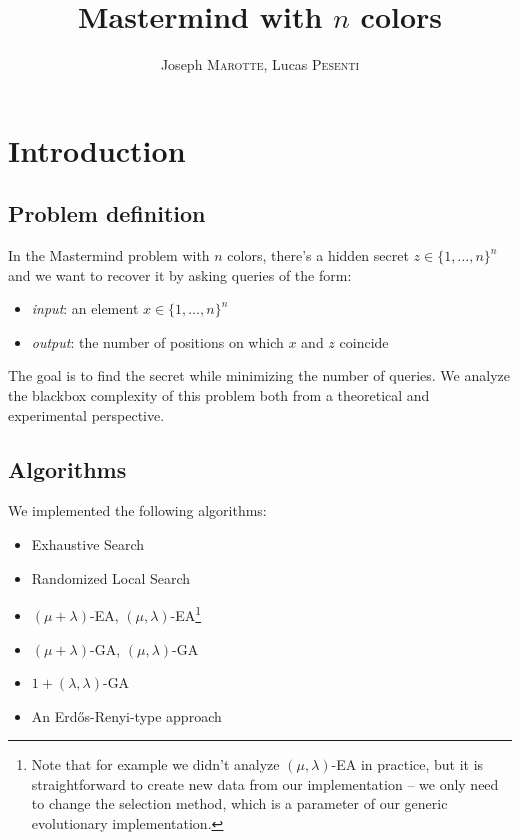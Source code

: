 \documentclass[12pt]{article}
\title{Mastermind with $n$ colors}
\author{Joseph \textsc{Marotte}, Lucas \textsc{Pesenti}}
\date{}
\theoremstyle{definition}
\theoremstyle{plain}
\theoremstyle{remark}
\begin{document}
\maketitle

\section{Introduction}

\subsection{Problem definition}

In the Mastermind problem with $n$ colors, there's a hidden secret $z\in \{1, \ldots, n\}^n$
and we want to recover it by asking queries of the form:

\begin{itemize}
	\item \textit{input}: an element $x\in\{1,\dots,n\}^n$
	\item \textit{output}: the number of positions on which $x$ and $z$ coincide
\end{itemize}

The goal is to find the secret while minimizing the number of queries. We analyze the
blackbox complexity of this problem both from a theoretical and experimental perspective.

\subsection{Algorithms}

We implemented the following algorithms:

\begin{itemize}
    \item Exhaustive Search
    \item Randomized Local Search
    \item $(\mu+\lambda)$-EA, $(\mu,\lambda)$-EA\footnote{Note that for example we didn't
        analyze $(\mu,\lambda)$-EA in practice, but it is straightforward to create new data
        from our implementation -- we only need to change the selection method, which is a
        parameter of our generic evolutionary implementation.}
    \item $(\mu+\lambda)$-GA, $(\mu,\lambda)$-GA
    \item $1+(\lambda,\lambda)$-GA
    \item An Erd\H{o}s-Renyi-type approach
\end{itemize}
\end{document}
